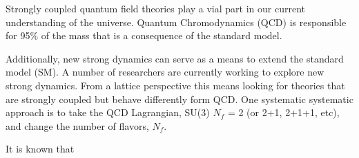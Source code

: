 
Strongly coupled quantum field theories play a vial part in our current understanding of the universe.
Quantum Chromodynamics (QCD) is responsible for 95\% of the mass that is a consequence of the standard model.

Additionally, new strong dynamics can serve as a means to extend the standard model (SM).
A number of researchers are currently working to explore new strong dynamics.
From a lattice perspective this means looking for theories that are strongly coupled but behave differently form QCD.
One systematic systematic approach is to take the QCD Lagrangian, SU(3) $N_f$ = 2 (or 2+1, 2+1+1, etc), and change the number of flavors, $N_f$.

It is known that 

